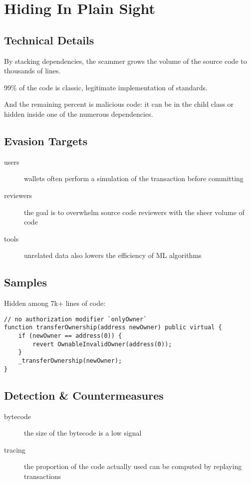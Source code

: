 \section{Hiding In Plain Sight} \label{sec:hiding-in-plain-sight}

\subsection{Technical Details}

By stacking dependencies, the scammer grows the volume of the source code to thousands of lines.

99\% of the code is classic, legitimate implementation of standards.

And the remaining percent is malicious code: it can be in the child class or hidden inside one of the numerous dependencies.

\subsection{Evasion Targets}

\begin{description}
\item[users]{wallets often perform a simulation of the transaction before committing}
\item[reviewers]{the goal is to overwhelm source code reviewers with the sheer volume of code}
\item[tools]{unrelated data also lowers the efficiency of ML algorithms}
\end{description}

\subsection{Samples}

Hidden among 7k+ lines of code:

\begin{lstlisting}
// no authorization modifier `onlyOwner`
function transferOwnership(address newOwner) public virtual {
    if (newOwner == address(0)) {
        revert OwnableInvalidOwner(address(0));
    }
    _transferOwnership(newOwner);
}
\end{lstlisting}

\subsection{Detection \& Countermeasures}

\begin{description}
\item[bytecode]{the size of the bytecode is a low signal}
\item[tracing]{the proportion of the code actually used can be computed by replaying transactions}
\end{description}
